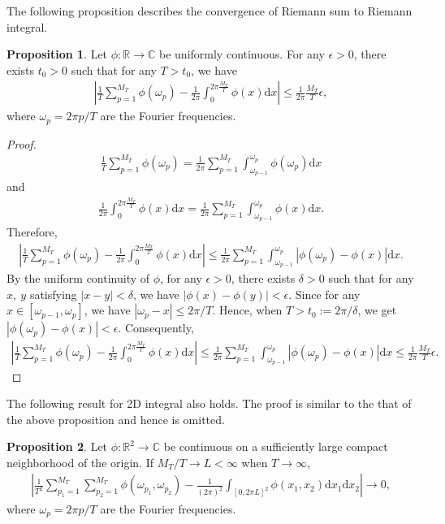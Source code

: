 \documentclass[11pt]{article}
\numberwithin{equation}{section}
\theoremstyle{plain}
\theoremstyle{definition}
\theoremstyle{definition}
\theoremstyle{assumption}
\theoremstyle{proposition}
\newtheorem{proposition}{Proposition}[section]
\theoremstyle{proposition}
\theoremstyle{example}
\theoremstyle{lemma}
\theoremstyle{theorem}
\theoremstyle{remark}
\begin{document}
The following proposition describes the convergence of Riemann sum to Riemann integral.
\begin{proposition}\label{conv_Riemann_sum_prop}
Let $\phi:\mathbb{R}\rightarrow\mathbb{C}$ be uniformly continuous. For any $\epsilon>0$, there exists $t_0>0$ such that for any $T>t_0$, we have
\begin{align*}
\left|\frac{1}{T}\sum_{p=1}^{M_T} \phi(\omega_p) - \frac{1}{2\pi}\int_0^{2\pi\frac{M_T}{T}}\phi(x)\mathrm{d}x \right|
\leqslant\frac{1}{2\pi}\frac{M_T}{T}\epsilon ,
\end{align*}
where $\omega_p = 2\pi p/T$ are the Fourier frequencies.
\begin{proof}
\begin{align*}
\frac{1}{T}\sum_{p=1}^{M_T} \phi(\omega_p)
=\frac{1}{2\pi}\sum_{p=1}^{M_T} \int_{\omega_{p-1}}^{\omega_p} \phi(\omega_p)\mathrm{d}x
\end{align*}
and
\begin{align*}
\frac{1}{2\pi}\int_0^{2\pi\frac{M_T}{T}}\phi(x)\mathrm{d}x
=\frac{1}{2\pi}\sum_{p=1}^{M_T} \int_{\omega_{p-1}}^{\omega_p} \phi(x)\mathrm{d}x .
\end{align*}
Therefore,
\begin{align*}
\left|\frac{1}{T}\sum_{p=1}^{M_T} \phi(\omega_p) - \frac{1}{2\pi}\int_0^{2\pi\frac{M_T}{T}}\phi(x)\mathrm{d}x \right|
\leqslant\frac{1}{2\pi}\sum_{p=1}^{M_T} \int_{\omega_{p-1}}^{\omega_p} |\phi(\omega_p) - \phi(x)|\mathrm{d}x .
\end{align*}
By the uniform continuity of $\phi$, for any $\epsilon > 0$, there exists $\delta>0$ such that for any $x,~y$ satisfying $|x-y|<\delta$, we have $|\phi(x) - \phi(y)|<\epsilon$. Since for any $x\in [\omega_{p-1}, \omega_{p}]$, we have $|\omega_{p} - x|\leqslant 2\pi/T$. Hence, when $T>t_0:= 2\pi/\delta$, we get $|\phi(\omega_p) - \phi(x)|<\epsilon$. Consequently, 
\begin{align*}
\left|\frac{1}{T}\sum_{p=1}^{M_T} \phi(\omega_p) - \frac{1}{2\pi}\int_0^{2\pi\frac{M_T}{T}}\phi(x)\mathrm{d}x \right|
\leqslant\frac{1}{2\pi}\sum_{p=1}^{M_T} \int_{\omega_{p-1}}^{\omega_p} |\phi(\omega_p) - \phi(x)|\mathrm{d}x 
\leqslant \frac{1}{2\pi}\frac{M_T}{T}\epsilon.
\end{align*}
\end{proof}
\end{proposition}
The following result for 2D integral also holds. The proof is similar to the that of the above proposition and hence is omitted.
\begin{proposition}\label{conv_Riemann_sum_prop2}
Let $\phi:\mathbb{R}^2\rightarrow\mathbb{C}$ be continuous on a sufficiently large compact neighborhood of the origin. If $M_T/T\rightarrow L<\infty$ when $T\rightarrow\infty$,
\begin{align*}
\left|\frac{1}{T^2}\sum_{p_1=1}^{M_T}\sum_{p_2=1}^{M_T} \phi(\omega_{p_1}, \omega_{p_2}) - \frac{1}{(2\pi)^2}\int_{[0, 2\pi L]^2}\phi(x_1, x_2)\mathrm{d}x_1 \mathrm{d}x_2 \right|
\rightarrow 0 ,
\end{align*}
where $\omega_p = 2\pi p/T$ are the Fourier frequencies.
\end{proposition}
\end{document}
